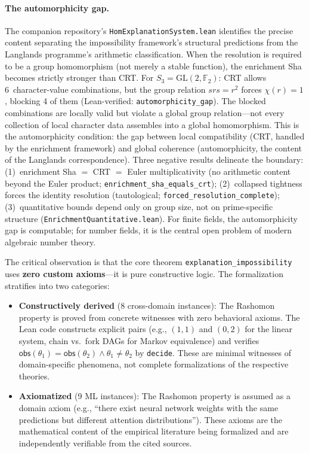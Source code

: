\documentclass[11pt,a4paper]{article}
\begin{document}
\paragraph{The automorphicity gap.}
The companion repository's \texttt{HomExplanationSystem.lean} identifies the precise content separating the impossibility framework's structural predictions from the Langlands programme's arithmetic classification.  When the resolution is required to be a group homomorphism (not merely a stable function), the enrichment Sha becomes strictly stronger than CRT.  For $S_3 = \mathrm{GL}(2, \mathbb{F}_2)$: CRT allows 6~character-value combinations, but the group relation $srs = r^2$ forces $\chi(r) = 1$, blocking 4 of them (Lean-verified: \texttt{automorphicity\_gap}).  The blocked combinations are locally valid but violate a global group relation---not every collection of local character data assembles into a global homomorphism.  This is the automorphicity condition: the gap between local compatibility (CRT, handled by the enrichment framework) and global coherence (automorphicity, the content of the Langlands correspondence).  Three negative results delineate the boundary: (1)~enrichment Sha $=$ CRT $=$ Euler multiplicativity (no arithmetic content beyond the Euler product; \texttt{enrichment\_sha\_equals\_crt}); (2)~collapsed tightness forces the identity resolution (tautological; \texttt{forced\_resolution\_complete}); (3)~quantitative bounds depend only on group size, not on prime-specific structure (\texttt{EnrichmentQuantitative.lean}).  For finite fields, the automorphicity gap is computable; for number fields, it is the central open problem of modern algebraic number theory.

The critical observation is that the core theorem
\texttt{explanation\_impossibility} uses \textbf{zero custom axioms}---it is pure
constructive logic.  The formalization stratifies into two categories:

\begin{itemize}
  \item \textbf{Constructively derived} (8 cross-domain instances): The
    Rashomon property is proved from concrete witnesses with zero behavioral
    axioms.  The Lean code constructs explicit pairs (e.g., $(1,1)$ and
    $(0,2)$ for the linear system, chain vs.\ fork DAGs for Markov
    equivalence) and verifies $\mathsf{obs}(\theta_1) = \mathsf{obs}(\theta_2)
    \wedge \theta_1 \ne \theta_2$ by \texttt{decide}.  These are minimal
    witnesses of domain-specific phenomena, not complete formalizations of the
    respective theories.

  \item \textbf{Axiomatized} (9 ML instances): The Rashomon property is
    assumed as a domain axiom (e.g., ``there exist neural network weights with
    the same predictions but different attention distributions'').  These
    axioms are the mathematical content of the empirical literature being
    formalized and are independently verifiable from the cited sources.
\end{itemize}
\end{document}
